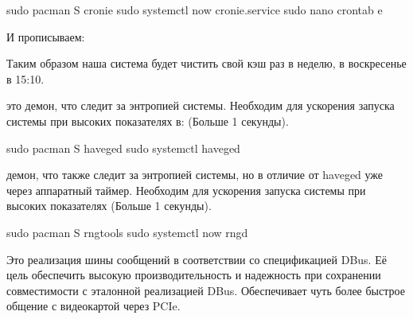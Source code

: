 \documentclass[letterpaper,10pt,russian,openany]{sphinxmanual}
\begin{document}
\begin{sphinxVerbatim}[commandchars=\\\{\}]
sudo pacman \PYGZhy{}S cronie                         
sudo systemctl  \PYGZhy{}\PYGZhy{}now cronie.service    
sudo nano crontab \PYGZhy{}e                   
\end{sphinxVerbatim}

\sphinxAtStartPar
И прописываем:

\sphinxAtStartPar
{}

\sphinxAtStartPar
Таким образом наша система будет чистить свой кэш раз в неделю, в воскресенье в 15:10.

\sphinxAtStartPar
{}  \sphinxhyphen{} это демон, что следит за энтропией системы.
Необходим для ускорения запуска системы при высоких показателях в:  (Больше 1 секунды).

\begin{sphinxVerbatim}[commandchars=\\\{\}]
sudo pacman \PYGZhy{}S haveged        
sudo systemctl  haveged 
\end{sphinxVerbatim}

\sphinxAtStartPar
{}  \sphinxhyphen{} демон, что также следит за энтропией системы, но в отличие от haveged уже через аппаратный таймер.
Необходим для ускорения запуска системы при высоких показателях  (Больше 1 секунды).

\begin{sphinxVerbatim}[commandchars=\\\{\}]
sudo pacman \PYGZhy{}S rng\PYGZhy{}tools         
sudo systemctl  \PYGZhy{}\PYGZhy{}now rngd 
\end{sphinxVerbatim}

\sphinxAtStartPar
{}  \sphinxhyphen{} Это реализация шины сообщений в соответствии со спецификацией D\sphinxhyphen{}Bus.
Её цель \sphinxhyphen{} обеспечить высокую производительность и надежность при сохранении совместимости с эталонной реализацией D\sphinxhyphen{}Bus.
Обеспечивает чуть более быстрое общение с видеокартой через PCIe.
\end{document}
